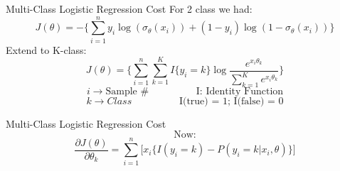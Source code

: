 \documentclass{beamer}
\begin{document}
	\begin{frame}{Multi-Class Logistic Regression Cost}
	    For 2 class we had:
	    \begin{equation*}
	        J(\theta) = -\bigg\{\sum_{i=1}^{n}y_{i}\log(\sigma_{\theta}(x_{i})) + (1 - y_{i})\log(1 - \sigma_{\theta}(x_{i}))\bigg\}
	    \end{equation*}
	    Extend to K-class:
	    \begin{equation*}
	        J(\theta) = \bigg\{\sum_{i=1}^{n}\sum_{k=1}^{K}I\{y_{i} = k\}\log\frac{e^{x_{i}\theta_{k}}}{\sum_{k=1}^{K}e^{x_{i}\theta_{k}}}\bigg\}
	    \end{equation*}
	    \begin{equation*}
	        i \rightarrow \text{Sample #} \hspace{2cm} \text{I: Identity Function}
	    \end{equation*}
	    \begin{equation*}
	        k \rightarrow Class \hspace{2cm} \text{I(true) = 1; I(false) = 0}
	    \end{equation*}
	\end{frame}
	\begin{frame}{Multi-Class Logistic Regression Cost}
	    \begin{equation*}
	        \text{Now:}
	    \end{equation*}
	    \begin{equation*}
	        \frac{\partial J(\theta)}{\partial \theta_{k}} = \sum_{i=1}^{n}\bigg[x_{i}\bigg\{I(y_{i} = k) - P(y_{i} = k | x_{i}, \theta)\bigg\}\bigg]
	    \end{equation*}
	\end{frame}
\end{document}
